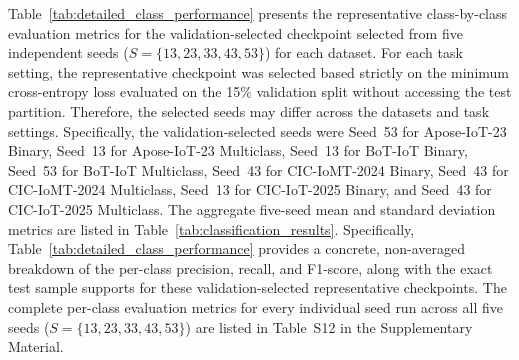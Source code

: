\documentclass[a4paper,fleqn]{cas-sc}
\begin{document}
Table~\ref{tab:detailed_class_performance} presents the representative class-by-class evaluation metrics for the validation-selected checkpoint selected from five independent seeds ($S=\{13, 23, 33, 43, 53\}$) for each dataset. For each task setting, the representative checkpoint was selected based strictly on the minimum cross-entropy loss evaluated on the 15\% validation split without accessing the test partition. Therefore, the selected seeds may differ across the datasets and task settings. Specifically, the validation-selected seeds were Seed~53 for Apose-IoT-23 Binary, Seed~13 for Apose-IoT-23 Multiclass, Seed~13 for BoT-IoT Binary, Seed~53 for BoT-IoT Multiclass, Seed~43 for CIC-IoMT-2024 Binary, Seed~43 for CIC-IoMT-2024 Multiclass, Seed~13 for CIC-IoT-2025 Binary, and Seed~43 for CIC-IoT-2025 Multiclass. The aggregate five-seed mean and standard deviation metrics are listed in Table~\ref{tab:classification_results}. Specifically, Table~\ref{tab:detailed_class_performance} provides a concrete, non-averaged breakdown of the per-class precision, recall, and F1-score, along with the exact test sample supports for these validation-selected representative checkpoints. The complete per-class evaluation metrics for every individual seed run across all five seeds ($S=\{13, 23, 33, 43, 53\}$) are listed in Table~S12 in the Supplementary Material.
\end{document}
